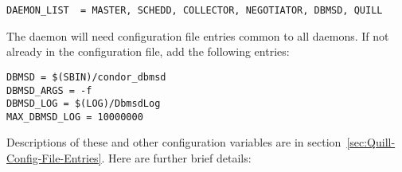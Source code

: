 \footnotesize
\begin{verbatim}
DAEMON_LIST  = MASTER, SCHEDD, COLLECTOR, NEGOTIATOR, DBMSD, QUILL
\end{verbatim}
\normalsize

The  daemon will need configuration file entries
common to all daemons.
If not already in the configuration file, add the following entries:

\begin{verbatim}
DBMSD = $(SBIN)/condor_dbmsd
DBMSD_ARGS = -f
DBMSD_LOG = $(LOG)/DbmsdLog
MAX_DBMSD_LOG = 10000000
\end{verbatim}

Descriptions of these and other configuration variables are in
section~\ref{sec:Quill-Config-File-Entries}.
Here are further brief details:

